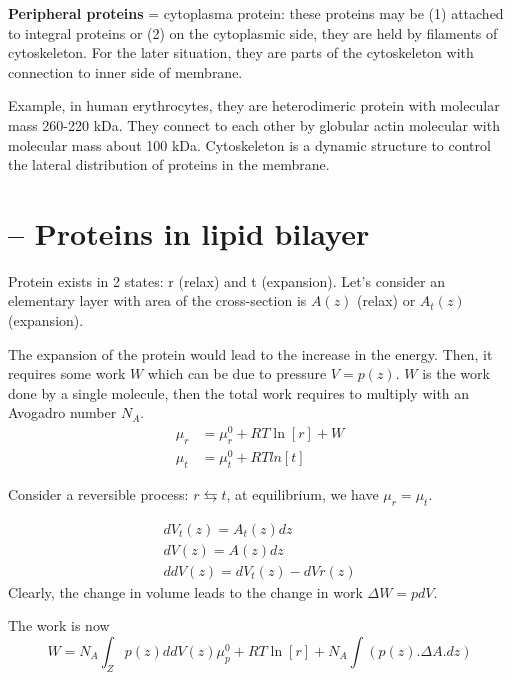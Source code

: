 {\bf Peripheral proteins} = cytoplasma protein: these proteins may be
(1) attached to integral proteins or (2) on the cytoplasmic side, they
are held by filaments of cytoskeleton. For the later situation, they
are parts of the cytoskeleton with connection to inner side of
membrane. 

Example, in human erythrocytes, they are heterodimeric protein with
molecular mass 260-220 kDa. They connect to each other by globular
actin molecular with molecular mass about 100 kDa.  Cytoskeleton is a
dynamic structure to control the lateral distribution of proteins in
the membrane.

\section{-- Proteins in lipid bilayer}
\label{sec:prot-lipid-bilay}

Protein exists in 2 states: r (relax) and t (expansion).
Let's consider an elementary layer with area of the cross-section is
$A(z)$ (relax) or $A_t(z)$ (expansion). 

The expansion of the protein would lead to the increase in the
energy. Then, it requires some work $W$ which can be due to pressure
$V=p(z)$. $W$ is the work done by a single molecule, then the total
work requires to multiply with an Avogadro number $N_A$.
\begin{equation}
  \label{eq:4}
  \begin{split}
    \mu_r &= \mu_r^0 + RT \ln[r] + W \\
\mu_t &= \mu_t^0 + RT ln[t]
  \end{split}
\end{equation}

Consider a reversible process: $r \leftrightarrows t$, at equilibrium,
we have $\mu_r = \mu_t$.

\begin{equation}
  \label{eq:5}
  \begin{split}
      dV_t(z) = A_t(z) dz \\
dV(z) = A(z) dz \\
ddV(z) = dV_t(z) - dVr(z)
  \end{split}
\end{equation}
Clearly, the change in volume leads to the change in work $\Delta W =
p dV$.

The work is now 
\begin{equation}
  \label{eq:6}
  W = N_A\int_Z p(z) ddV(z)
\mu_p^0 + RT \ln[r] + N_A\int(p(z).\Delta A.dz)
\end{equation}

